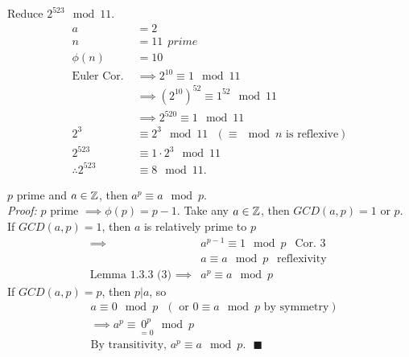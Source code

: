 \begin{example}
Reduce $2^{523}\mod 11$.
\begin{align}
    a&=2 \nonumber \\
    n&=11 \ \ \textit{prime} \nonumber \\
    \phi(n)&= 10 \nonumber \\
    \text{Euler Cor. }&\implies 2^{10}\equiv 1 \mod 11 \nonumber \\
    &\implies (2^{10})^{52}\equiv 1^{52}\mod 11 \nonumber \\
    &\implies 2^{520}\equiv 1 \mod 11 \nonumber \\
    2^3&\equiv 2^3\mod 11 \ \ \ (\equiv \mod n \text{ is reflexive})\nonumber \\
    2^{523}&\equiv 1\cdot 2^{3}\mod 11\nonumber \\
    \therefore 2^{523}&\equiv 8 \mod 11 . \nonumber
\end{align}
\end{example}
\setcounter{dummy_lemma}{0}
\begin{corollary}
$p$ prime and $a\in {\mathbb{ Z}}$, then $a^p\equiv a \mod p$. \\
\textit{Proof:} $p$ prime $\implies \phi(p)=p-1$. Take any $a\in {\mathbb{ Z}}$, then $GCD(a,p)=1$ or $p$. \\
If $GCD(a,p)=1$, then $a$ is relatively prime to $p$
\begin{align}
    \implies &a^{p-1}\equiv 1\mod p \ \ \text{ Cor. 3}\nonumber \\
    &a\equiv a \mod p \ \ \text{ reflexivity } \nonumber \\
    \text{Lemma 1.3.3 (3) }\implies &a^p\equiv a\mod p \nonumber 
\end{align}
If $GCD(a,p)=p$, then $p|a$, so 
\begin{align}
    &a\equiv 0 \mod p \ \ \ (\text{ or } 0\equiv a \mod p \text{ by symmetry})\nonumber \\
    &\implies a^p\equiv \underset{=0}{0^p}\mod p \nonumber \\
    &\text{By transitivity, }a^p\equiv a \mod p. \ \ \ \blacksquare \nonumber
\end{align}
\end{corollary}

